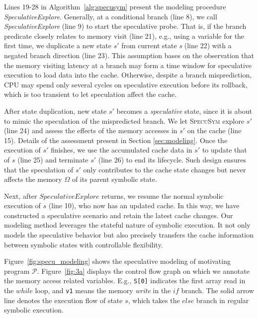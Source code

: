 \documentclass[sigconf]{acmart}
\newcommand{\SpecuSym}{\textsc{SpecuSym} }
\newcommand{\prog}{\mathcal{P}}
\begin{document}
Lines 19-28 in Algorithm~\ref{alg:specusym} present the modeling procedure 
\textit{SpeculativeExplore}. Generally, at a conditional branch (line 8), 
we call \textit{SpeculativeExplore} (line 9) to start the speculative probe. 
That is, if the branch predicate closely relates to memory visit (line 21), 
e.g., using a variable for the first time, we duplicate a new state $s'$ 
from current state \textit{s} (line 22) with a negated branch direction 
(line 23). This assumption bases on the observation that the memory visiting 
latency at a branch may form a time window for speculative execution to load 
data into the cache. Otherwise, despite a branch misprediction, CPU may spend 
only several cycles on speculative execution before its rollback, which is too 
transient to let speculation affect the cache.


After state duplication, new state ${s'}$ becomes a \textit{speculative} state, 
since it is about to mimic the speculation of the mispredicted branch. We let 
\SpecuSym explore $s'$ (line 24) and assess the effects of the memory accesses 
in $s'$ on the cache (line 15). Details of the assessment present in Section
\ref{sec:modeling}. Once the execution of $s'$ finishes, we use the accumulated 
cache data in $s'$ to update that of $s$ (line 25) and terminate $s'$ (line 26) 
to end its lifecycle. Such design ensures that the speculation of $s'$ only 
contributes to the cache state changes but never affects the memory $\Omega$ of 
its parent symbolic state.


Next, after $\mathit{SpeculativeExplore}$ returns, we resume the normal symbolic
execution of $s$ (line 10), who now has an updated cache. In this way, we   have 
constructed a speculative scenario and retain the latest cache changes. Our
modeling method leverages the stateful nature of symbolic execution. It not only 
models the speculative behavior but also precisely transfers the cache information 
between symbolic states with controllable flexibility. 


Figure~\ref{fig:specu_modeling} shows the speculative modeling of motivating 
program $\prog$. Figure~\ref{fig:3a} displays the control flow graph on 
which we annotate the memory access related variables. E.g., \texttt{S[0]} 
indicates the first array read in the $\mathit{while}$ loop, and \texttt{v1} 
means the memory \emph{write} in the $\mathit{if}$ branch. The solid arrow 
line denotes the execution flow of state $s$, which takes the $\mathit{else}$ 
branch in regular symbolic execution. 
\end{document}
